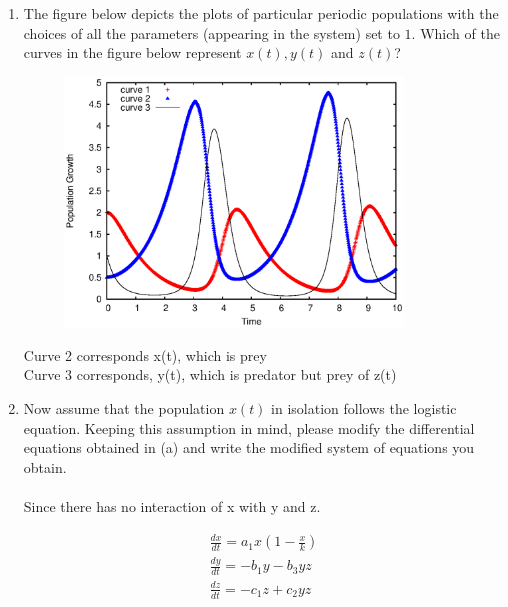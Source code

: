 \documentclass[12pt]{article}
\begin{document}
\begin{enumerate}[{\bf I.}]
\begin{enumerate}
  \item The figure below depicts the plots of particular periodic populations with the choices of all the parameters (appearing in the system) set to $1$. Which of the curves in the figure below represent $x(t), y(t)$ and $z(t)$?
  \begin{figure}[!ht]
    \centering
      \includegraphics[width=0.85\textwidth]{maxplot.eps} %
  \end{figure} 
   Curve 2 corresponds x(t), which is prey\\
   Curve 3 corresponds, y(t), which is predator but prey of z(t)
    \item Now assume that the population $x(t)$ in isolation follows the logistic equation. Keeping this assumption in mind, please modify the differential equations obtained in (a) and write the modified system of equations you obtain.
    \\\\
    Since there has no interaction of x with y and z.
    
    \begin{align}
    \frac{dx}{dt} = a_1x(1 - \frac{x}{k}) \\
    \frac{dy}{dt} = -b_1y  -b_3yz\\
    \frac{dz}{dt} = -c_1z + c_2 yz\\
    \end{align}
 \end{enumerate}
\end{enumerate}
\end{document}
